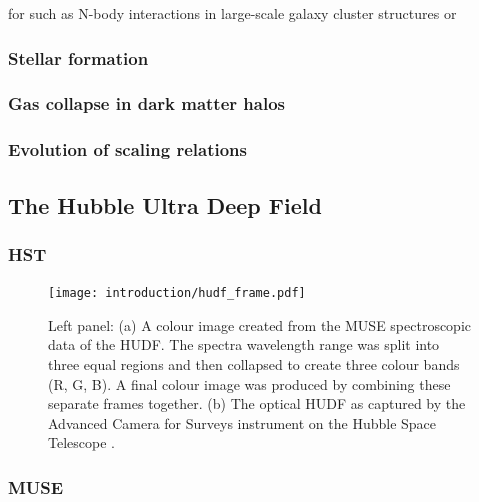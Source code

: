 \documentclass[12pt, twocolumn]{revtex4}    %
\begin{document}
for such as N-body interactions in large-scale galaxy cluster structures or 

\subsubsection{Stellar formation}

\subsubsection{Gas collapse in dark matter halos}

\subsubsection{Evolution of scaling relations}

\subsection{The Hubble Ultra Deep Field}

\subsubsection{HST}

\begin{figure}
\texttt{[image: introduction/hudf\_frame.pdf]}
\captionsetup{justification=raggedright}
\caption[Hubble Ultra Deep Field]{Left panel: (a) A colour image created from the MUSE spectroscopic data of the HUDF. The spectra wavelength range was split into three equal regions and then collapsed to create three colour bands (R, G, B). A final colour image was produced by combining these separate frames together. (b) The optical HUDF as captured by the Advanced Camera for Surveys instrument on the Hubble Space Telescope \citep{hudf_image}. }
\label{fig:hst_muse_hdf}
\end{figure}

\subsubsection{MUSE}
\end{document}
